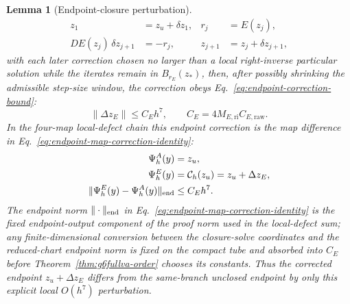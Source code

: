 \documentclass[preprint,12pt]{elsarticle}
\newtheorem{lemma}{Lemma}
\begin{document}
\begin{lemma}[Endpoint-closure perturbation]
\begin{equation}
\begin{aligned}
  z_1&=z_u+\delta z_1, & r_j&=E(z_j),\\
  D E(z_j)\,\delta z_{j+1}&=-r_j, &
  z_{j+1}&=z_j+\delta z_{j+1},
  \end{aligned}
\end{equation}
with each later correction chosen no larger than a local right-inverse
particular solution while the iterates remain in \(B_{r_E}(z_\ast)\), then,
after possibly shrinking the admissible step-size window, the correction obeys
Eq.~\eqref{eq:endpoint-correction-bound}:
\begin{equation}
\label{eq:endpoint-correction-bound}
  \|\Delta z_E\|\le C_E h^7,\qquad
  C_E=4M_{E,\mathrm{ri}}C_{E,\mathrm{raw}} .
\end{equation}
In the four-map local-defect chain this endpoint correction is the map
difference in Eq.~\eqref{eq:endpoint-map-correction-identity}:
\begin{equation}
\label{eq:endpoint-map-correction-identity}
\begin{aligned}
  \Psi_h^A(y)&=z_u,\\
  \Psi_h^E(y)&=\mathcal C_h(z_u)=z_u+\Delta z_E,\\
  \|\Psi_h^E(y)-\Psi_h^A(y)\|_{\rm end}&\le C_Eh^7 .
\end{aligned}
\end{equation}
The endpoint norm \(\|\cdot\|_{\rm end}\) in
Eq.~\eqref{eq:endpoint-map-correction-identity} is the fixed endpoint-output
component of the proof norm used in the local-defect sum; any
finite-dimensional conversion between the closure-solve coordinates and the
reduced-chart endpoint norm is fixed on the compact tube and absorbed into
\(C_E\) before Theorem~\ref{thm:g6fullva-order} chooses its constants.  Thus
the corrected endpoint \(z_u+\Delta z_E\) differs from the same-branch
unclosed endpoint by only this explicit local \(O(h^7)\) perturbation.
\end{lemma}
\end{document}
